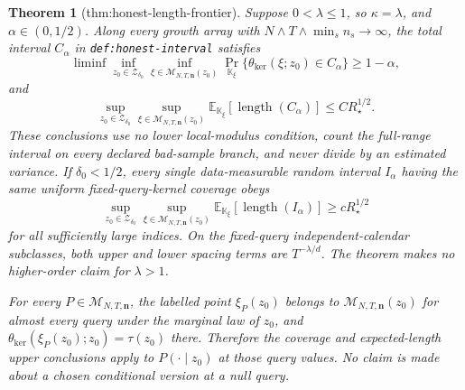\documentclass{article}
\newtheorem{theorem}{Theorem}
\begin{document}
\begin{theorem}[thm:honest-length-frontier]\label{thm:honest-length-frontier}
Suppose \(0<\lambda\le1\), so \(\kappa=\lambda\), and
\(\alpha\in(0,1/2)\).  Along every growth array with
\(N\wedge T\wedge\min_s n_s\to\infty\), the total interval \(C_\alpha\)
in \texttt{def:honest-interval} satisfies
\[
 \liminf
 \inf_{z_0\in\mathcal Z_{\delta_0}}
 \inf_{\xi\in\mathcal M_{N,T,\mathbf n}(z_0)}
 \Pr_{\mathbb K_\xi}
 \{\theta_{\mathrm{ker}}(\xi;z_0)\in C_\alpha\}
 \ge1-\alpha,
\]
and
\[
 \sup_{z_0\in\mathcal Z_{\delta_0}}
 \sup_{\xi\in\mathcal M_{N,T,\mathbf n}(z_0)}
 \mathbb E_{\mathbb K_\xi}[\operatorname{length}(C_\alpha)]
 \le CR_\star^{1/2}.
\]
These conclusions use no lower local-modulus condition, count the full-range
interval on every declared bad-sample branch, and never divide by an
estimated variance.  If \(\delta_0<1/2\), every single data-measurable
random interval \(I_\alpha\) having the same uniform fixed-query-kernel
coverage obeys
\[
 \sup_{z_0\in\mathcal Z_{\delta_0}}
 \sup_{\xi\in\mathcal M_{N,T,\mathbf n}(z_0)}
 \mathbb E_{\mathbb K_\xi}[\operatorname{length}(I_\alpha)]
 \ge cR_\star^{1/2}
\]
for all sufficiently large indices.  On the fixed-query
independent-calendar subclasses, both upper and lower spacing terms are
\(T^{-\lambda/d}\).  The theorem makes no higher-order claim for
\(\lambda>1\).

For every \(P\in\mathcal M_{N,T,\mathbf n}\), the labelled point
\(\xi_P(z_0)\) belongs to \(\mathcal M_{N,T,\mathbf n}(z_0)\) for almost
every query under the marginal law of \(z_0\), and
\(\theta_{\mathrm{ker}}(\xi_P(z_0);z_0)=\tau(z_0)\) there.  Therefore the
coverage and expected-length upper conclusions apply to
\(P(\cdot\mid z_0)\) at those query values.  No claim is made about a
chosen conditional version at a null query.
\end{theorem}
\end{document}
